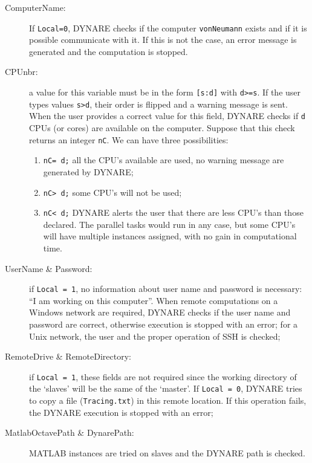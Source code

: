 \documentclass[12pt,a4paper,pdftex]{article}
\begin{document}

\begin{description}
\item[ComputerName:] If \verb"Local=0", DYNARE checks if the computer \verb"vonNeumann" exists and if it is possible communicate with it. If this is not the case, an error message is generated and the computation is stopped.
\item[CPUnbr:] a value for this variable must be in the form \verb"[s:d]" with \verb"d>=s". If the user types  values \verb"s>d", their order is flipped and a warning message is sent. When the user provides a correct value for this field, DYNARE checks if \verb"d" CPUs (or cores) are available on the computer. Suppose that this check returns an integer \verb"nC". We can have three possibilities:
    \begin{enumerate}
    \item \verb"nC= d;" all the CPU's available are used, no warning message are generated by DYNARE;
    \item \verb"nC> d;" some CPU's will not be used;
    \item \verb"nC< d;" DYNARE alerts the user that there are less CPU's than those declared. The parallel tasks would run in any case, but some CPU's will have multiple instances assigned, with no gain in computational time.
    \end{enumerate}
\item[UserName \& Password:] if \verb"Local = 1", no information about user name and password is necessary: ``I am working on this computer''. When remote computations on a Windows network are required, DYNARE checks if the user name and password are correct, otherwise execution is stopped with an error; for a Unix network, the user and the proper operation of SSH is checked;
\item[RemoteDrive \& RemoteDirectory:] if \verb"Local = 1", these fields are not required since the working directory of the `slaves' will be the same of the `master'. If \verb"Local = 0", DYNARE tries to copy a file (\verb"Tracing.txt") in this remote location. If this operation fails, the DYNARE execution is stopped with an error;
\item[MatlabOctavePath \& DynarePath:] MATLAB instances are tried on slaves and the DYNARE path is checked.
\end{description}
\end{document}
